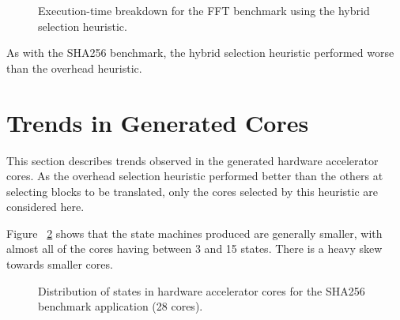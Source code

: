 \documentclass{UoYCSproject}
\begin{document}
\begin{figure}[H]
\caption{Execution-time breakdown for the FFT benchmark using the hybrid selection heuristic.}
\label{fig:breakdownHybridFFT}
\end{figure}

As with the SHA256 benchmark, the hybrid selection heuristic performed worse than the overhead heuristic.

\section{Trends in Generated Cores}

This section describes trends observed in the generated hardware accelerator cores.
As the overhead selection heuristic performed better than the others at selecting blocks to be
translated, only the cores selected by this heuristic are considered here.

Figure ~\ref{fig:statesSHA256-28} shows that the state machines produced are generally smaller,
with almost all of the cores having between 3 and 15 states. There is a heavy skew towards smaller
cores.

\begin{figure}[H]
\caption{Distribution of states in hardware accelerator cores for the SHA256 benchmark application (28 cores).}
\label{fig:statesSHA256-28}
\end{figure}
\end{document}
